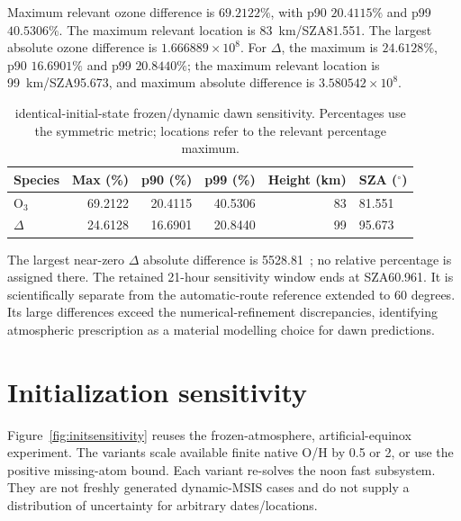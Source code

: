 Maximum relevant ozone difference is $69.2122\%$, with p90 $20.4115\%$ and p99 $40.5306\%$. The maximum relevant location is 83~km/SZA81.551. The largest absolute ozone difference is $1.666889\times10^8$. For $\Delta$, the maximum is $24.6128\%$, p90 $16.6901\%$ and p99 $20.8440\%$; the maximum relevant location is 99~km/SZA95.673, and maximum absolute difference is $3.580542\times10^8$.

\begin{table}[htbp]\centering\small
\caption{identical-initial-state frozen/dynamic dawn sensitivity. Percentages use the symmetric metric; locations refer to the relevant percentage maximum.}\label{tab:atmsensitivity}
\begin{tabular}{lrrrrl}\toprule Species & Max (\%) & p90 (\%) & p99 (\%) & Height (km) & SZA ($^\circ$)\\\midrule
O$_3$ & 69.2122 & 20.4115 & 40.5306 & 83 & 81.551\\
$\Delta$ & 24.6128 & 16.6901 & 20.8440 & 99 & 95.673\\\bottomrule
\end{tabular}\end{table}


The largest near-zero $\Delta$ absolute difference is 5528.81~\concunit; no relative percentage is assigned there. The retained 21-hour sensitivity window ends at SZA60.961. It is scientifically separate from the automatic-route reference extended to 60 degrees. Its large differences exceed the numerical-refinement discrepancies, identifying atmospheric prescription as a material modelling choice for dawn predictions.
\clearpage

\section{Initialization sensitivity}
Figure~\ref{fig:initsensitivity} reuses the frozen-atmosphere, artificial-equinox experiment. The variants scale available finite native O/H by 0.5 or 2, or use the positive missing-atom bound. Each variant re-solves the noon fast subsystem. They are not freshly generated dynamic-MSIS cases and do not supply a distribution of uncertainty for arbitrary dates/locations.

